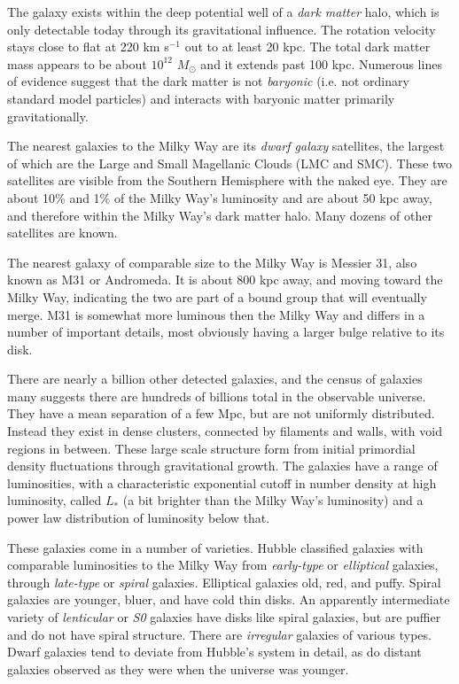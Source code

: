 The galaxy exists within the deep potential well of a {\it dark
  matter} halo, which is only detectable today through its
gravitational influence. The rotation velocity stays close to flat at
220 km s$^{-1}$ out to at least 20 kpc. The total dark matter mass
appears to be about $10^{12}$ $M_\odot$ and it extends past 100
kpc. Numerous lines of evidence suggest that the dark matter is not
{\it baryonic} (i.e. not ordinary standard model particles) and
interacts with baryonic matter primarily gravitationally.

The nearest galaxies to the Milky Way are its {\it dwarf galaxy}
satellites, the largest of which are the Large and Small Magellanic
Clouds (LMC and SMC). These two satellites are visible from the
Southern Hemisphere with the naked eye. They are about 10\% and 1\% of
the Milky Way's luminosity and are about 50 kpc away, and therefore
within the Milky Way's dark matter halo. Many dozens of other
satellites are known.

The nearest galaxy of comparable size to the Milky Way is Messier 31,
also known as M31 or Andromeda. It is about 800 kpc away, and moving
toward the Milky Way, indicating the two are part of a bound group
that will eventually merge. M31 is somewhat more luminous then the
Milky Way and differs in a number of important details, most obviously
having a larger bulge relative to its disk.

There are nearly a billion other detected galaxies, and the census of
galaxies many suggests there are hundreds of billions total in the
observable universe. They have a mean separation of a few Mpc, but are
not uniformly distributed. Instead they exist in dense clusters,
connected by filaments and walls, with void regions in between. These
large scale structure form from initial primordial density
fluctuations through gravitational growth. The galaxies have a range
of luminosities, with a characteristic exponential cutoff in number
density at high luminosity, called $L_\ast$ (a bit brighter than the
Milky Way's luminosity) and a power law distribution of luminosity
below that.

These galaxies come in a number of varieties. Hubble classified
galaxies with comparable luminosities to the Milky Way from {\it
  early-type} or {\it elliptical} galaxies, through {\it late-type} or
{\it spiral} galaxies.  Elliptical galaxies old, red, and
puffy. Spiral galaxies are younger, bluer, and have cold thin
disks. An apparently intermediate variety of {\it lenticular} or {\it
  S0} galaxies have disks like spiral galaxies, but are puffier and do
not have spiral structure. There are {\it irregular} galaxies of
various types. Dwarf galaxies tend to deviate from Hubble's system in
detail, as do distant galaxies observed as they were when the universe
was younger.

